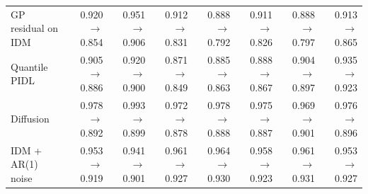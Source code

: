 \begin{table}[htbp]
\begin{tabular}{lrrrrrrr}
GP residual on IDM & 0.920 $\rightarrow$ 0.854 & 0.951 $\rightarrow$ 0.906 & 0.912 $\rightarrow$ 0.831 & 0.888 $\rightarrow$ 0.792 & 0.911 $\rightarrow$ 0.826 & 0.888 $\rightarrow$ 0.797 & 0.913 $\rightarrow$ 0.865 \\
Quantile PIDL & 0.905 $\rightarrow$ 0.886 & 0.920 $\rightarrow$ 0.900 & 0.871 $\rightarrow$ 0.849 & 0.885 $\rightarrow$ 0.863 & 0.888 $\rightarrow$ 0.867 & 0.904 $\rightarrow$ 0.897 & 0.935 $\rightarrow$ 0.923 \\
Diffusion & 0.978 $\rightarrow$ 0.892 & 0.993 $\rightarrow$ 0.899 & 0.972 $\rightarrow$ 0.878 & 0.978 $\rightarrow$ 0.888 & 0.975 $\rightarrow$ 0.887 & 0.969 $\rightarrow$ 0.901 & 0.976 $\rightarrow$ 0.896 \\
IDM + AR(1) noise & 0.953 $\rightarrow$ 0.919 & 0.941 $\rightarrow$ 0.901 & 0.961 $\rightarrow$ 0.927 & 0.964 $\rightarrow$ 0.930 & 0.958 $\rightarrow$ 0.923 & 0.961 $\rightarrow$ 0.931 & 0.953 $\rightarrow$ 0.927 \\
\bottomrule
\end{tabular}
\end{table}
